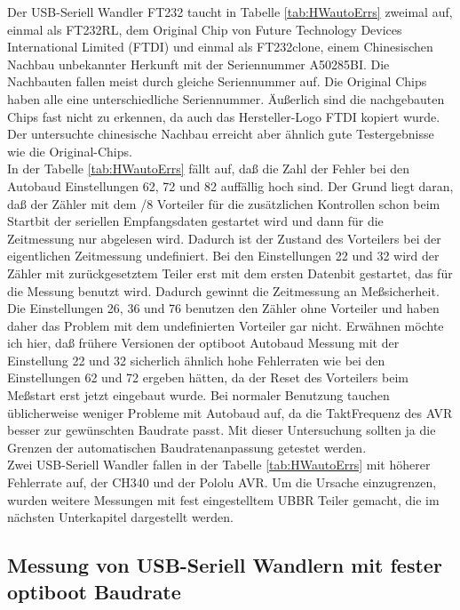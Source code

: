 Der USB-Seriell Wandler FT232 taucht in Tabelle \ref{tab:HWautoErrs} zweimal auf, einmal als FT232RL,
dem Original Chip von Future Technology Devices International Limited (FTDI) und einmal
als FT232clone, einem Chinesischen Nachbau unbekannter Herkunft mit der Seriennummer A50285BI.
Die Nachbauten fallen meist durch gleiche Seriennummer auf. Die Original Chips haben alle
eine unterschiedliche Seriennummer. Äußerlich sind die nachgebauten Chips fast nicht zu
erkennen, da auch das Hersteller-Logo FTDI kopiert wurde.
Der untersuchte chinesische Nachbau erreicht aber ähnlich gute Testergebnisse
wie die Original-Chips.\\

In der Tabelle \ref{tab:HWautoErrs} fällt auf, daß die Zahl der Fehler bei den Autobaud 
Einstellungen 62, 72  und 82 auffällig hoch sind. Der Grund liegt daran, daß der
Zähler mit dem /8 Vorteiler für die zusätzlichen Kontrollen schon beim Startbit der
seriellen Empfangsdaten gestartet wird und dann für die Zeitmessung nur abgelesen wird.
Dadurch ist der Zustand des Vorteilers bei der eigentlichen Zeitmessung undefiniert.
Bei den Einstellungen 22 und 32 wird der Zähler mit zurückgesetztem Teiler erst mit
dem ersten Datenbit gestartet, das für die Messung benutzt wird.
Dadurch gewinnt die Zeitmessung an Meßsicherheit.
Die Einstellungen 26, 36 und 76 benutzen den Zähler ohne Vorteiler und haben daher
das Problem mit dem undefinierten Vorteiler gar nicht.
Erwähnen möchte ich hier, daß frühere Versionen der optiboot Autobaud Messung mit
der Einstellung 22 und 32 sicherlich ähnlich hohe Fehlerraten wie bei den 
Einstellungen 62 und 72 ergeben hätten, da der Reset des Vorteilers beim Meßstart
erst jetzt eingebaut wurde. Bei normaler Benutzung tauchen üblicherweise weniger
Probleme mit Autobaud auf, da die TaktFrequenz des AVR besser zur gewünschten 
Baudrate passt. Mit dieser Untersuchung sollten ja die Grenzen der automatischen
Baudratenanpassung getestet werden.\\

Zwei USB-Seriell Wandler fallen in der Tabelle \ref{tab:HWautoErrs} mit höherer
Fehlerrate auf, der CH340 und der Pololu AVR. Um die Ursache einzugrenzen, wurden
weitere Messungen mit fest eingestelltem UBBR Teiler gemacht, die im nächsten Unterkapitel
dargestellt werden.

\subsection{Messung von USB-Seriell Wandlern mit fester optiboot Baudrate}

